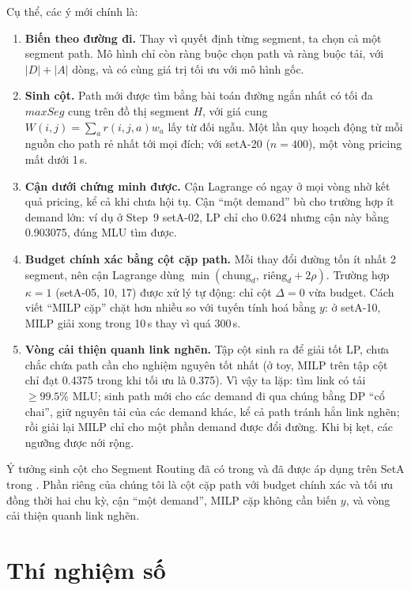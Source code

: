 \documentclass[11pt,a4paper]{article}
\begin{document}
Cụ thể, các ý mới chính là:
\begin{enumerate}
\item \textbf{Biến theo đường đi.} Thay vì quyết định từng segment, ta chọn cả một segment path. Mô hình chỉ còn ràng buộc chọn path và ràng buộc tải, với $|D|+|A|$ dòng, và có cùng giá trị tối ưu với mô hình gốc.
\item \textbf{Sinh cột.} Path mới được tìm bằng bài toán đường ngắn nhất có tối đa $maxSeg$ cung trên đồ thị segment $H$, với giá cung $W(i,j)=\sum_a r(i,j,a)w_a$ lấy từ đối ngẫu. Một lần quy hoạch động từ mỗi nguồn cho path rẻ nhất tới mọi đích; với setA-20 ($n=400$), một vòng pricing mất dưới 1\,s.
\item \textbf{Cận dưới chứng minh được.} Cận Lagrange có ngay ở mọi vòng nhờ kết quả pricing, kể cả khi chưa hội tụ. Cận ``một demand'' bù cho trường hợp ít demand lớn: ví dụ ở Step~9 setA-02, LP chỉ cho 0.624 nhưng cận này bằng 0.903075, đúng MLU tìm được.
\item \textbf{Budget chính xác bằng cột cặp path.} Mỗi thay đổi đường tốn ít nhất 2 segment, nên cận Lagrange dùng $\min(\text{chung}_d,\ \text{riêng}_d+2\rho)$. Trường hợp $\kappa=1$ (setA-05, 10, 17) được xử lý tự động: chỉ cột $\Delta=0$ vừa budget. Cách viết ``MILP cặp'' chặt hơn nhiều so với tuyến tính hoá bằng $y$: ở setA-10, MILP giải xong trong 10\,s thay vì quá 300\,s.
\item \textbf{Vòng cải thiện quanh link nghẽn.} Tập cột sinh ra để giải tốt LP, chưa chắc chứa path cần cho nghiệm nguyên tốt nhất (ở toy, MILP trên tập cột chỉ đạt 0.4375 trong khi tối ưu là 0.375). Vì vậy ta lặp: tìm link có tải $\ge 99.5\%$ MLU; sinh path mới cho các demand đi qua chúng bằng DP ``cổ chai'', giữ nguyên tải của các demand khác, kể cả path tránh hẳn link nghẽn; rồi giải lại MILP chỉ cho một phần demand được đổi đường. Khi bị kẹt, các ngưỡng được nới rộng.
\end{enumerate}
Ý tưởng sinh cột cho Segment Routing đã có trong \cite{cg4sr} và đã được áp dụng trên SetA trong \cite{jaumard2026}. Phần riêng của chúng tôi là cột cặp path với budget chính xác và tối ưu đồng thời hai chu kỳ, cận ``một demand'', MILP cặp không cần biến $y$, và vòng cải thiện quanh link nghẽn.

\section{Thí nghiệm số}\label{sec:exp}
\end{document}
